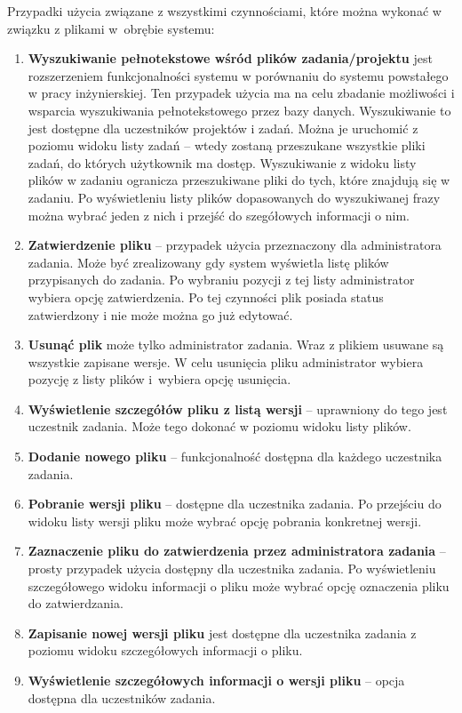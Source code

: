 Przypadki użycia związane z wszystkimi czynnościami, które można wykonać w związku z plikami w~obrębie systemu:
\begin{enumerate}
    \item \textbf{Wyszukiwanie pełnotekstowe wśród plików zadania/projektu} jest rozszerzeniem funkcjonalności systemu w porównaniu do systemu powstałego w pracy inżynierskiej.
    Ten przypadek użycia ma na celu zbadanie możliwości i wsparcia wyszukiwania pełnotekstowego przez bazy danych.
    Wyszukiwanie to jest dostępne dla uczestników projektów i zadań.
    Można je uruchomić z poziomu widoku listy zadań -- wtedy zostaną przeszukane wszystkie pliki zadań, do których użytkownik ma dostęp.
    Wyszukiwanie z widoku listy plików w zadaniu ogranicza przeszukiwane pliki do tych, które znajdują się w zadaniu.
    Po wyświetleniu listy plików dopasowanych do wyszukiwanej frazy można wybrać jeden z nich i przejść do szegółowych informacji o nim.
    \item \textbf{Zatwierdzenie pliku} -- przypadek użycia przeznaczony dla administratora zadania. 
    Może być zrealizowany gdy system wyświetla listę plików przypisanych do zadania. 
    Po wybraniu pozycji z tej listy administrator wybiera opcję zatwierdzenia. 
    Po tej czynności plik posiada status zatwierdzony i nie może można go już edytować.
    \item  \textbf{Usunąć plik} może tylko administrator zadania. 
    Wraz z plikiem usuwane są wszystkie zapisane wersje. 
    W celu usunięcia pliku administrator wybiera pozycję z listy plików i~wybiera opcję usunięcia.
    \item \textbf{Wyświetlenie szczegółów pliku z listą wersji} -- uprawniony do tego jest uczestnik zadania.
    Może tego dokonać w poziomu widoku listy plików.
    \item \textbf{Dodanie nowego pliku} -- funkcjonalność dostępna dla każdego uczestnika zadania. 
    \item \textbf{Pobranie wersji pliku} -- dostępne dla uczestnika zadania. 
    Po przejściu do widoku listy wersji pliku może wybrać opcję pobrania konkretnej wersji.
    \item \textbf{Zaznaczenie pliku do zatwierdzenia przez administratora zadania} -- prosty przypadek użycia dostępny dla uczestnika zadania.
    Po wyświetleniu  szczegółowego widoku informacji o pliku może wybrać opcję oznaczenia pliku do zatwierdzania.
    \item \textbf{Zapisanie nowej wersji pliku} jest dostępne dla uczestnika zadania z poziomu widoku szczegółowych informacji o pliku.
    \item \textbf{Wyświetlenie szczegółowych informacji o wersji pliku} -- opcja dostępna dla uczestników zadania.
\end{enumerate}

